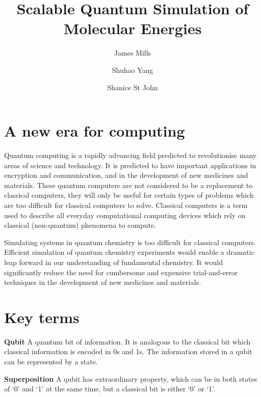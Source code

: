 \documentclass[14pt,landscape,color=UCLdarkred,margin=3cm]{uclposter}
\title{Scalable Quantum Simulation of Molecular Energies}
\author{James Mills}
\author{Shuhao Yang}
\author{Shanice St John}
\affil[1]{MSc Quantum Technologies, UCL}
\begin{document}

\maketitle

\begin{multicols}{3}

\section*{A new era for computing}


Quantum computing is a rapidly advancing field predicted to revolutionise many
areas of science and technology. It is predicted to have important applications in encryption and communication, and in the development of new medicines and materials. These quantum computers are not considered to be a replacement to classical computers, they will only be useful for certain types of problems which are too difficult for classical computers to solve. Classical computers is a term used to describe all everyday computational computing devices which rely on classical (non-quantum) phenomena to compute.

Simulating systems in quantum chemistry is too difficult for classical computers. Efficient simulation of quantum chemistry experiments would enable a dramatic leap forward in our understanding of fundamental chemistry. It would significantly reduce the need for cumbersome and expensive trial-and-error techniques in the development of new medicines and materials.

\section*{Key terms}


\begin{highlightbox}
	\textbf{Qubit} A quantum bit of information. It is analogous to the classical bit which classical information is encoded in 0s and 1s. The information stored in a qubit can be represented by a state.
\end{highlightbox}

\begin{highlightbox}
  \textbf{Superposition} A qubit has extraordinary property, which can be in both states of `0' and `1' at the same time, but a classical bit is either `0' or `1'.
\end{highlightbox}




\end{multicols}
\end{document}
